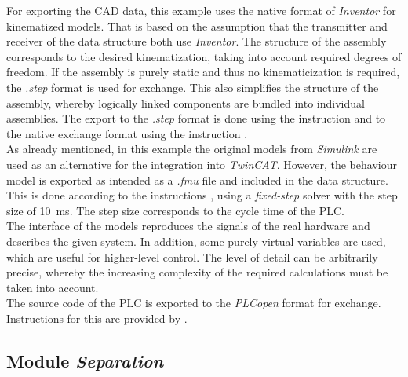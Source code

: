     For exporting the CAD data, this example uses the native format of \textit{Inventor} for kinematized models. That is based on the assumption that the transmitter and receiver of the data structure both use \textit{Inventor}. The structure of the assembly corresponds to the desired kinematization, taking into account required degrees of freedom. If the assembly is purely static and thus no kinematicization is required, the \textit{.step} format is used for exchange. This also simplifies the structure of the assembly, whereby logically linked components are bundled into individual assemblies. The export to the \textit{.step} format is done using the instruction \cite{InventorAnleitungExportStep} and to the native exchange format using the instruction \cite{InventorAnleitungExportPackAndGo}. \\
    
    As already mentioned, in this example the original models from \textit{Simulink} are used as an alternative for the integration into \textit{TwinCAT}. However, the behaviour model is exported as intended as a \textit{.fmu} file and included in the data structure. This is done according to the instructions \cite{MatlabFmuExport}, using a \textit{fixed-step} solver with the step size of \SI{10}{\milli\second}. The step size corresponds to the cycle time of the PLC. \\
    The interface of the models reproduces the signals of the real hardware and describes the given system. In addition, some purely virtual variables are used, which are useful for higher-level control. The level of detail can be arbitrarily precise, whereby the increasing complexity of the required calculations must be taken into account. \\
    
    The source code of the PLC is exported to the \textit{PLCopen} format for exchange. Instructions for this are provided by \cite{TwincatExportPlcopen}.

    
\subsection{Module \textit{Separation}}
